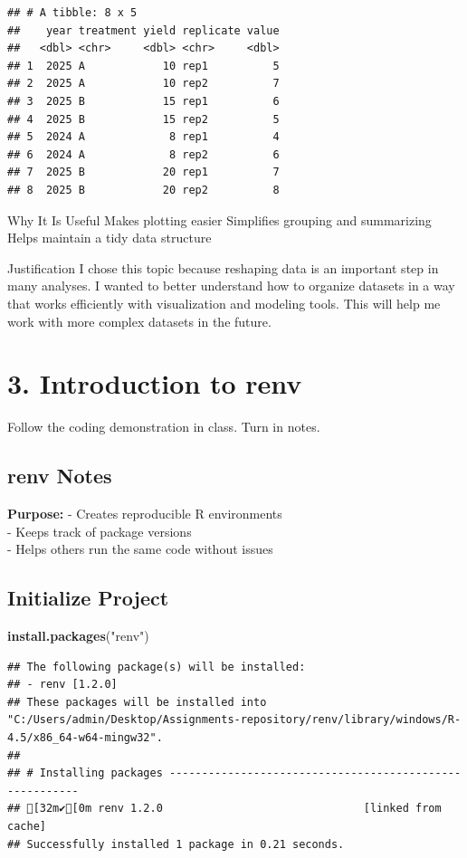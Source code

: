\documentclass[
]{article}
\newenvironment{Shaded}{\begin{snugshade}}{\end{snugshade}}
\newcommand{\FunctionTok}[1]{\textcolor[rgb]{0.13,0.29,0.53}{\textbf{#1}}}
\newcommand{\NormalTok}[1]{#1}
\newcommand{\StringTok}[1]{\textcolor[rgb]{0.31,0.60,0.02}{#1}}
\begin{document}
\begin{verbatim}
## # A tibble: 8 x 5
##    year treatment yield replicate value
##   <dbl> <chr>     <dbl> <chr>     <dbl>
## 1  2025 A            10 rep1          5
## 2  2025 A            10 rep2          7
## 3  2025 B            15 rep1          6
## 4  2025 B            15 rep2          5
## 5  2024 A             8 rep1          4
## 6  2024 A             8 rep2          6
## 7  2025 B            20 rep1          7
## 8  2025 B            20 rep2          8
\end{verbatim}

Why It Is Useful Makes plotting easier Simplifies grouping and
summarizing Helps maintain a tidy data structure

Justification I chose this topic because reshaping data is an important
step in many analyses. I wanted to better understand how to organize
datasets in a way that works efficiently with visualization and modeling
tools. This will help me work with more complex datasets in the future.

\section{3. Introduction to renv}\label{introduction-to-renv}

Follow the coding demonstration in class. Turn in notes.

\subsection{renv Notes}\label{renv-notes}

\textbf{Purpose:} - Creates reproducible R environments\\
- Keeps track of package versions\\
- Helps others run the same code without issues

\subsection{Initialize Project}\label{initialize-project}

\begin{Shaded}
\begin{Highlighting}[]
\FunctionTok{install.packages}\NormalTok{(}\StringTok{"renv"}\NormalTok{)}
\end{Highlighting}
\end{Shaded}

\begin{verbatim}
## The following package(s) will be installed:
## - renv [1.2.0]
## These packages will be installed into "C:/Users/admin/Desktop/Assignments-repository/renv/library/windows/R-4.5/x86_64-w64-mingw32".
## 
## # Installing packages --------------------------------------------------------
## [32m✔[0m renv 1.2.0                               [linked from cache]
## Successfully installed 1 package in 0.21 seconds.
\end{verbatim}
\end{document}
